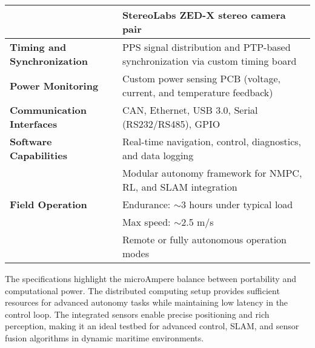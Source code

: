 \begin{table}[H]
\begin{tabular}{|p{4cm}|p{9cm}|}
        & StereoLabs ZED-X stereo camera pair \\ \hline
        \textbf{Timing and Synchronization} & PPS signal distribution and PTP-based synchronization via custom timing board \\ \hline
        \textbf{Power Monitoring} & Custom power sensing PCB (voltage, current, and temperature feedback) \\ \hline
        \textbf{Communication Interfaces} & CAN, Ethernet, USB 3.0, Serial (RS232/RS485), GPIO \\ \hline
        \textbf{Software Capabilities} & Real-time navigation, control, diagnostics, and data logging \\ 
        & Modular autonomy framework for NMPC, RL, and SLAM integration \\ \hline
        \textbf{Field Operation} & Endurance: $\sim$3 hours under typical load \\ 
        & Max speed: $\sim$2.5 m/s \\ 
        & Remote or fully autonomous operation modes \\ \hline
    \end{tabular}
\end{table}
\noindent
The specifications highlight the microAmpere balance between portability and computational power. The distributed computing setup provides sufficient resources for advanced autonomy tasks while maintaining low latency in the control loop. The integrated sensors enable precise positioning and rich perception, making it an ideal testbed for advanced control, SLAM, and sensor fusion algorithms in dynamic maritime environments.
